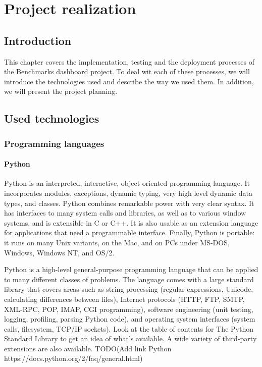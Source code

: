 \chapter{Project realization}
\section{Introduction}
This chapter covers the implementation, testing and the deployment processes of
the Benchmarks dashboard project. To deal wit each of these processes, we will
introduce the technologies used and describe the way we used them. In
addition, we will present the project planning.
\pagebreak

\section{Used technologies}
\subsection{Programming languages}
\subsubsection{Python}
Python is an interpreted, interactive, object-oriented programming language. It
incorporates modules, exceptions, dynamic typing, very high level dynamic data
types, and classes. Python combines remarkable power with very clear syntax. It
has interfaces to many system calls and libraries, as well as to various window
systems, and is extensible in C or C++. It is also usable as an extension
language for applications that need a programmable interface. Finally, Python is
portable: it runs on many Unix variants, on the Mac, and on PCs under MS-DOS,
Windows, Windows NT, and OS/2.

Python is a high-level general-purpose programming language that can be applied
to many different classes of problems. The language comes with a large standard
library that covers areas such as string processing (regular expressions,
Unicode, calculating differences between files), Internet protocols (HTTP, FTP,
SMTP, XML-RPC, POP, IMAP, CGI programming), software engineering (unit testing,
logging, profiling, parsing Python code), and operating system interfaces
(system calls, filesystem, TCP/IP sockets). Look at the table of contents for
The Python Standard Library to get an idea of what’s available. A wide variety
of third-party extensions are also available.
TODO(Add link Python https://docs.python.org/2/faq/general.html)

